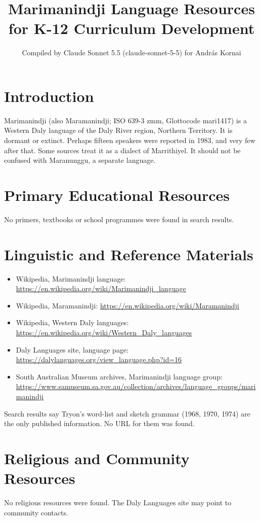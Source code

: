 \documentclass[12pt]{article}
\title{Marimanindji Language Resources for K-12 Curriculum Development}
\author{Compiled by Claude Sonnet 5.5 (claude-sonnet-5-5) for Andr\'as Kornai}
\date{}
\begin{document}
\maketitle

\section{Introduction}
Marimanindji (also Maramanindji; ISO 639-3 zmm, Glottocode mari1417) is a Western Daly language of the Daly River region, Northern Territory. It is dormant or extinct. Perhaps fifteen speakers were reported in 1983, and very few after that. Some sources treat it as a dialect of Marrithiyel. It should not be confused with Maranunggu, a separate language.

\section{Primary Educational Resources}
No primers, textbooks or school programmes were found in search results.

\section{Linguistic and Reference Materials}
\begin{itemize}
\item Wikipedia, Marimanindji language: \url{https://en.wikipedia.org/wiki/Marimanindji_language}
\item Wikipedia, Maramanindji: \url{https://en.wikipedia.org/wiki/Maramanindji}
\item Wikipedia, Western Daly languages: \url{https://en.wikipedia.org/wiki/Western_Daly_languages}
\item Daly Languages site, language page: \url{https://dalylanguages.org/view_language.php?id=16}
\item South Australian Museum archives, Marimanindji language group: \url{https://www.samuseum.sa.gov.au/collection/archives/language_groups/marimanindji}
\end{itemize}
Search results say Tryon's word-list and sketch grammar (1968, 1970, 1974) are the only published information. No URL for them was found.

\section{Religious and Community Resources}
No religious resources were found. The Daly Languages site may point to community contacts.
\end{document}
